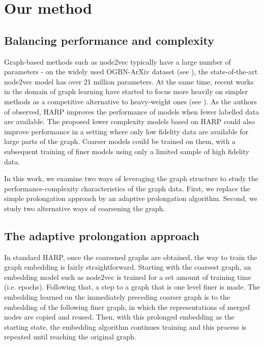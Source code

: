 \section{Our method}

\subsection{Balancing performance and complexity}

Graph-based methods such as node2vec typically have a large number of parameters - on the widely used OGBN-ArXiv dataset (see \cite{hu_open_2021}), the state-of-the-art node2vec model has over 21 million parameters. At the same time, recent works in the domain of graph learning have started to focus more heavily on simpler methods as a competitive alternative to heavy-weight ones (see \cite{frasca_sign_2020,huang_combining_2020,salha_keep_2019,zhang_eigen-gnn_2021}). As the authors of \cite{chen_harp_2018} observed, HARP improves the performance of models when fewer labelled data are available. The proposed lower complexity models based on HARP could also improve performance in a setting where only low fidelity data are available for large parts of the graph. Coarser models could be trained on them, with a subsequent training of finer models using only a limited sample of high fidelity data.

In this work, we examine two ways of leveraging the graph structure to study the performance-complexity characteristics of the graph data. First, we replace the simple prolongation approach by an adaptive prolongation algorithm. Second, we study two alternative ways of coarsening the graph.

\subsection{The adaptive prolongation approach}\label{sec:adaptive-prolongation}

In standard HARP, once the coarsened graphs are obtained, the way to train the graph embedding is fairly straightforward. Starting with the coarsest graph, an embedding model such as node2vec is trained for a set amount of training time (i.e. epochs). Following that, a step to a graph that is one level finer is made. The embedding learned on the immediately preceding coarser graph is  to the embedding of the following finer graph, in which the representations of merged nodes are copied and reused. Then, with this prolonged embedding as the starting state, the embedding algorithm continues training and this process is repeated until reaching the original graph.

